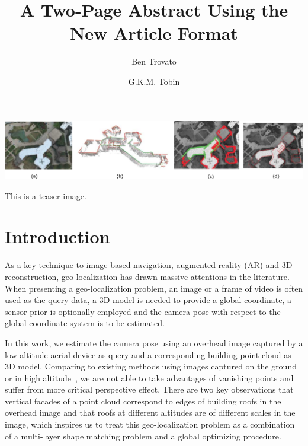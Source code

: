 \documentclass[sigconf,review,anonymous]{acmart}
\begin{document}
\title{A Two-Page Abstract Using the New Article Format}

\author{Ben Trovato}

\author{G.K.M. Tobin}

\renewcommand{\shortauthors}{B. Trovato et. al.}

\begin{teaserfigure}
  \includegraphics[width=\textwidth]{figures/teaser_pdf}
  \caption{This is a teaser image.}
  \label{fig:teaser}
\end{teaserfigure}


\maketitle

\section{Introduction}
%
As a key technique to image-based navigation, augmented reality (AR) and 3D reconstruction, geo-localization has drawn massive attentions in the literature. When presenting a geo-localization problem, an image or a frame of video is often used as the query data, a 3D model is needed to provide a global coordinate, a sensor prior is optionally employed and the camera pose with respect to the global coordinate system is to be estimated. 

In this work, we estimate the camera pose using an overhead image captured by a low-altitude aerial device as query and a corresponding building point cloud as 3D model. Comparing to existing methods using images captured on the ground~\cite{instant} or in high altitude~\cite{FDCM}, we are not able to take advantages of vanishing points and suffer from more critical perspective effect. There are two key observations that vertical facades of a point cloud correspond to edges of building roofs in the overhead image and that roofs at different altitudes are of different scales in the image, which inspires us to treat this geo-localization problem as a combination of a multi-layer shape matching problem and a global optimizing procedure. 
%
\end{document}
